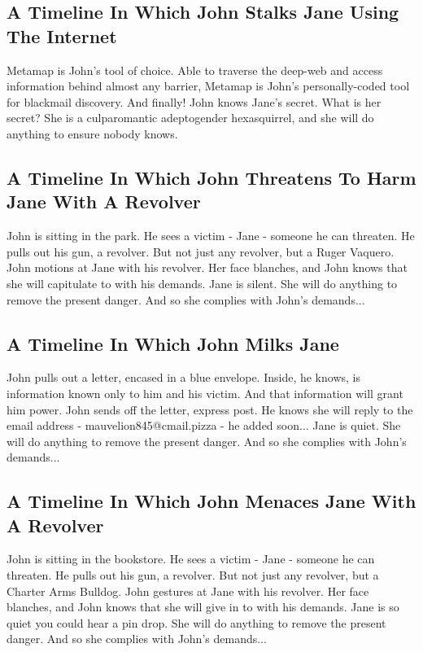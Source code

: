 \documentclass{article}
\begin{document}
\subsection{A Timeline In Which John Stalks Jane Using The Internet}


Metamap is John's tool of choice. Able to traverse the deep{-}web and access information behind almost any barrier, Metamap is John's personally{-}coded tool for blackmail discovery.
And finally!
John knows Jane's secret. What is her secret? She is a culparomantic adeptogender hexasquirrel, and she will do anything to ensure nobody knows.
\subsection{A Timeline In Which John Threatens To Harm Jane With A Revolver}


John is sitting in the park.
He sees a victim {-} Jane {-} someone he can threaten. He pulls out his gun, a revolver.
But not just any revolver, but a Ruger Vaquero.
John motions at Jane with his revolver. Her face blanches, and John knows that she will capitulate to with his demands.
Jane is silent. She will do anything to remove the present danger. And so she complies with John's demands...
\subsection{A Timeline In Which John Milks Jane}


John pulls out a letter, encased in a blue envelope. Inside, he knows, is information known only to him and his victim. And that information will grant him power.
John sends off the letter, express post. He knows she will reply to the email address {-} mauvelion845@cmail.pizza {-} he added soon...
Jane is quiet. She will do anything to remove the present danger. And so she complies with John's demands...
\subsection{A Timeline In Which John Menaces Jane With A Revolver}


John is sitting in the bookstore.
He sees a victim {-} Jane {-} someone he can threaten. He pulls out his gun, a revolver.
But not just any revolver, but a Charter Arms Bulldog.
John gestures at Jane with his revolver. Her face blanches, and John knows that she will give in to with his demands.
Jane is so quiet you could hear a pin drop. She will do anything to remove the present danger. And so she complies with John's demands...
\end{document}
